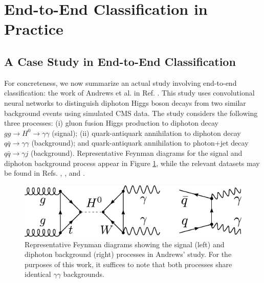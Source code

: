 \documentclass[11pt, a4paper]{article}
\newcommand{\myhref}[2]{\hyperref[#1]{\textcolor{blue}{#2}}}
\begin{document}



\section{End-to-End Classification in Practice}
\subsection{A Case Study in End-to-End Classification}
For concreteness, we now summarize an actual study involving end-to-end classification: the work of Andrews et al. in Ref. \cite{andrews-higgs}. This study uses convolutional neural networks to distinguish diphoton Higgs boson decays from two similar background events using simulated CMS data. The study considers the following three processes: (i) gluon fusion Higgs production to diphoton decay  $ gg \to H^{0} \to \gamma \gamma $ (signal); (ii) quark-antiquark annihilation to diphoton decay $ q \bar{q} \to \gamma \gamma $ (background); and quark-antiquark annihilation to photon+jet decay $ q \bar{q} \to \gamma j $ (background). Representative Feynman diagrams for the signal and diphoton background process appear in Figure \ref{fig:feynman-signal-bg}, while the relevant datasets may be found in Refs. \cite{data-bg-diphoton}, \cite{data-bg-jet}, and \cite{data-signal}.
 


\begin{figure}[htb!]
    \centering
    \includegraphics[width=0.8\linewidth]{vector/feynman-signal-bg.pdf}
    \caption{Representative Feynman diagrams showing the signal (left) and diphoton background (right) processes in Andrews' study. For the purposes of this work, it suffices to note that both processes share identical $ \gamma \gamma $ backgrounds.}
    \label{fig:feynman-signal-bg}
\end{figure}
\end{document}
